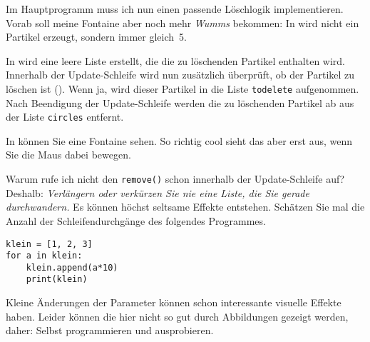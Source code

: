 
Im Hauptprogramm muss ich nun einen passende Löschlogik implementieren. Vorab soll meine Fontaine aber noch mehr \emph{Wumms} bekommen: In  wird nicht ein Partikel erzeugt, sondern immer gleich~5.

In  wird eine leere Liste erstellt, die die zu löschenden Partikel enthalten wird. Innerhalb der Update-Schleife wird nun zusätzlich überprüft, ob der Partikel zu löschen ist (). Wenn ja, wird dieser Partikel in die Liste \texttt{todelete} aufgenommen. Nach Beendigung der Update-Schleife werden die zu löschenden Partikel ab  aus der Liste \texttt{circles} entfernt.

In  können Sie eine Fontaine sehen. So richtig cool sieht das aber erst aus, wenn Sie die Maus dabei bewegen.


Warum rufe ich nicht den \texttt{remove()} schon innerhalb der Update-Schleife auf? Deshalb: \emph{Verlängern oder verkürzen Sie nie eine Liste, die Sie gerade durchwandern.} Es können höchst seltsame Effekte entstehen. Schätzen Sie mal die Anzahl der Schleifendurchgänge des folgendes Programmes.

\begin{lstlisting}[firstnumber=1]
klein = [1, 2, 3]
for a in klein:
    klein.append(a*10)
    print(klein)	
\end{lstlisting}

Kleine Änderungen der Parameter können schon interessante visuelle Effekte haben. Leider können die hier nicht so gut durch Abbildungen gezeigt werden, daher: Selbst programmieren und ausprobieren.




